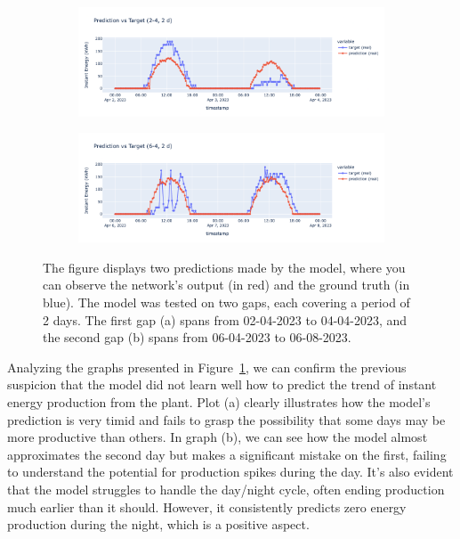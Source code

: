 \begin{figure}[H]
	\centering
	\begin{subfigure}{\textwidth}
		\centering
		\includegraphics[width=\textwidth]{chapters/3_models/imgs/ufnc/eval/ufcpred2-4.png}
		\caption{}
	\end{subfigure}
	\begin{subfigure}{\textwidth}
		\centering
		\includegraphics[width=\textwidth]{chapters/3_models/imgs/ufnc/eval/ufcpred6-4.png}
		\caption{}
	\end{subfigure}
	\caption{The figure displays two predictions made by the model, where you can observe the network's output (in red) and the ground truth (in blue). The model was tested on two gaps, each covering a period of 2 days. The first gap (a) spans from 02-04-2023 to 04-04-2023, and the second gap (b) spans from 06-04-2023 to 06-08-2023.}

	\label{fig:ufcnevalbelli}
\end{figure}

Analyzing the graphs presented in Figure~\ref{fig:ufcnevalbelli},
we can confirm the previous suspicion that the model did not learn well how
to predict the trend of instant energy production from the plant.
Plot (a) clearly illustrates how the model's prediction is very timid
and fails to grasp the possibility that some days may be more productive
than others.
In graph (b), we can see how the model almost approximates the second
day but makes a significant mistake on the first,
failing to understand the potential for production spikes during the day.
It's also evident that the model struggles to handle the
day/night cycle, often ending production much earlier than it should.
However, it consistently predicts zero energy production
during the night, which is a positive aspect.

